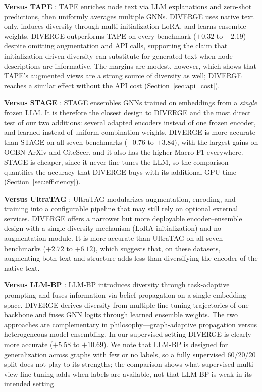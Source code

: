 \documentclass[a4paper,fleqn]{cas-sc}
\DeclareRobustCommand{\revcommon}[2][]{\textcolor{revshared}{#2}} %
\begin{document}
\textbf{Versus TAPE} \citep{he2024harnessing}: TAPE enriches node text via LLM explanations and zero-shot predictions, then uniformly averages multiple GNNs. DIVERGE uses native text only, induces diversity through multi-initialization LoRA, and learns ensemble weights. DIVERGE outperforms TAPE on every benchmark \revcommon[R2,R4]{($+0.32$ to $+2.19$)} despite omitting augmentation and API calls, supporting the claim that initialization-driven diversity can substitute for generated text when node descriptions are informative. \revcommon[R2,R4]{The margins are modest, however, which shows that TAPE's augmented views are a strong source of diversity as well; DIVERGE reaches a similar effect without the API cost (Section~\ref{sec:api_cost}).}

\textbf{Versus STAGE} \citep{zolnai-lucas-etal-2024-stage}: STAGE ensembles GNNs trained on embeddings from a \emph{single} frozen LLM. \revcommon[R2,R4]{It is therefore the closest design to DIVERGE and the most direct test of our two additions: several adapted encoders instead of one frozen encoder, and learned instead of uniform combination weights. DIVERGE is more accurate than STAGE on all seven benchmarks ($+0.76$ to $+3.84$), with the largest gains on OGBN-ArXiv and CiteSeer, and it also has the higher Macro-F1 everywhere. STAGE is cheaper, since it never fine-tunes the LLM, so the comparison quantifies the accuracy that DIVERGE buys with its additional GPU time (Section~\ref{sec:efficiency}).}

\textbf{Versus UltraTAG} \citep{yu2025ultratag}: UltraTAG modularizes augmentation, encoding, and training into a configurable pipeline that may still rely on optional external services. DIVERGE offers a narrower but more deployable encoder--ensemble design with a single diversity mechanism (LoRA initialization) and no augmentation module. \revcommon[R2,R4]{It is more accurate than UltraTAG on all seven benchmarks ($+2.72$ to $+6.12$), which suggests that, on these datasets, augmenting both text and structure adds less than diversifying the encoder of the native text.}

\textbf{Versus LLM-BP} \citep{wang2025llmbp}: LLM-BP introduces diversity through task-adaptive prompting and fuses information via belief propagation on a single embedding space. DIVERGE derives diversity from multiple fine-tuning trajectories of one backbone and fuses GNN logits through learned ensemble weights. The two approaches are complementary in philosophy---graph-adaptive propagation versus heterogeneous-model ensembling. \revcommon[R2,R4]{In our supervised setting DIVERGE is clearly more accurate ($+5.58$ to $+10.69$). We note that LLM-BP is designed for generalization across graphs with few or no labels, so a fully supervised 60/20/20 split does not play to its strengths; the comparison shows what supervised multi-view fine-tuning adds when labels are available, not that LLM-BP is weak in its intended setting.}
\end{document}
